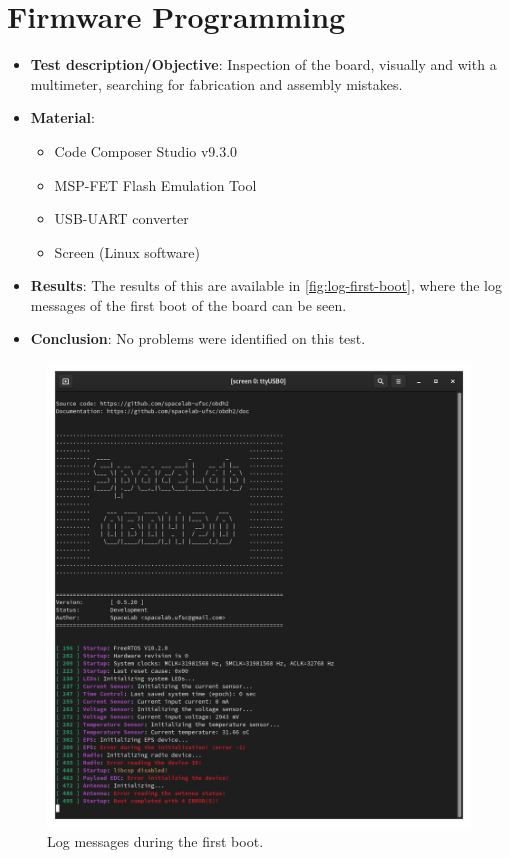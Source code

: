 \section{Firmware Programming}

\begin{itemize}
    \item \textbf{Test description/Objective}: Inspection of the board, visually and with a multimeter, searching for fabrication and assembly mistakes.
    \item \textbf{Material}:
        \begin{itemize}
            \item Code Composer Studio v9.3.0
            \item MSP-FET Flash Emulation Tool
            \item USB-UART converter
            \item Screen (Linux software)
        \end{itemize}
    \item \textbf{Results}: The results of this are available in \autoref{fig:log-first-boot}, where the log messages of the first boot of the board can be seen.
    \item \textbf{Conclusion}: No problems were identified on this test.
\end{itemize}

\begin{figure}[!ht]
    \begin{center}
        \includegraphics[width=0.7\columnwidth]{figures/v05/log-first-boot.png}
        \caption{Log messages during the first boot.}
        \label{fig:log-first-boot}
    \end{center}
\end{figure}

